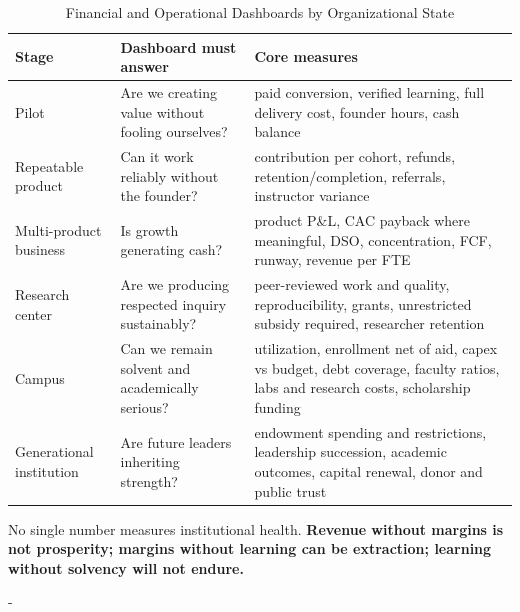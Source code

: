 \begin{table}[t]
\centering
\small
\caption{Financial and Operational Dashboards by Organizational State}
\label{tab:ch36_dashboards}
\begin{tabularx}{\textwidth}{p{3.0cm} p{4.8cm} X}
\toprule
\textbf{ Stage } & \textbf{ Dashboard must answer } & \textbf{ Core measures } \\
\midrule
 Pilot  &  Are we creating value without fooling ourselves?  &  paid conversion, verified learning, full delivery cost, founder hours, cash balance  \\
 Repeatable product  &  Can it work reliably without the founder?  &  contribution per cohort, refunds, retention/\allowbreak completion, referrals, instructor variance  \\
 Multi-product business  &  Is growth generating cash?  &  product P\&L, CAC payback where meaningful, DSO, concentration, FCF, runway, revenue per FTE  \\
 Research center  &  Are we producing respected inquiry sustainably?  &  peer-reviewed work and quality, reproducibility, grants, unrestricted subsidy required, researcher retention  \\
 Campus  &  Can we remain solvent and academically serious?  &  utilization, enrollment net of aid, capex vs budget, debt coverage, faculty ratios, labs and research costs, scholarship funding  \\
 Generational institution  &  Are future leaders inheriting strength?  &  endowment spending and restrictions, leadership succession, academic outcomes, capital renewal, donor and public trust  \\
\bottomrule
\end{tabularx}
\end{table}

No single number measures institutional health. \textbf{Revenue without margins is not prosperity; margins without learning can be extraction; learning without solvency will not endure.}

-


